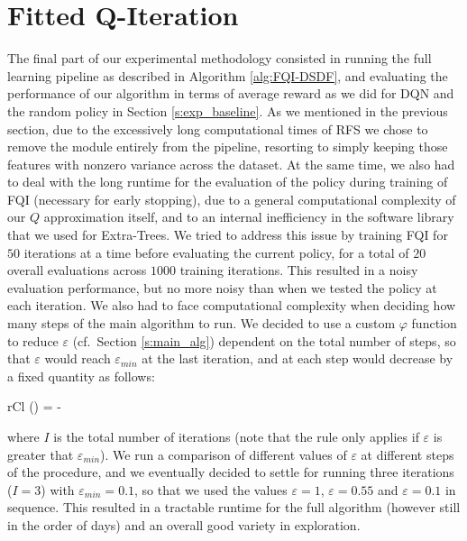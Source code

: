 \section{Fitted Q-Iteration} \label{s:exp_fqi}
The final part of our experimental methodology consisted in running the full
learning pipeline as described in Algorithm \ref{alg:FQI-DSDF}, and evaluating
the performance of our algorithm in terms of average reward as we did for DQN
and the random policy in Section \ref{s:exp_baseline}. 
As we mentioned in the previous section, due to the excessively long 
computational times of RFS we chose to remove the module entirely from the 
pipeline, resorting to simply keeping those features with nonzero variance 
across the dataset. 
At the same time, we also had to deal with the long runtime for the evaluation 
of the policy during training of FQI (necessary for early stopping), due to a 
general computational complexity of our $Q$ approximation itself, and to an 
internal inefficiency in the software library that we used for Extra-Trees.
We tried to address this issue by training FQI for $50$ iterations at a time
before evaluating the current policy, for a total of $20$ overall evaluations
across $1000$ training iterations. 
This resulted in a noisy evaluation performance, but no more noisy than when we
tested the policy at each iteration. 
We also had to face computational complexity when deciding how many steps
of the main algorithm to run. 
We decided to use a custom $\varphi$ function to reduce $\varepsilon$ (cf.\ 
Section \ref{s:main_alg}) dependent on the total number of steps, so that 
$\varepsilon$ would reach $\varepsilon_{min}$ at the last iteration, and 
at each step would decrease by a fixed quantity as follows:
%
\begin{IEEEeqnarray}{rCl}
    \varphi(\varepsilon) = \varepsilon - 
\end{IEEEeqnarray}
%
where $I$ is the total number of iterations (note that the rule only 
applies if $\varepsilon$ is greater that $\varepsilon_{min}$). 
We run a comparison of different values of $\varepsilon$ at 
different steps of the procedure, and we eventually decided to settle for 
running three iterations ($I = 3$) with $\varepsilon_{min} = 0.1$, so that we 
used the values $\varepsilon = 1$, $\varepsilon = 0.55$ and 
$\varepsilon = 0.1$ in sequence. 
This resulted in a tractable runtime for the full algorithm (however 
still in the order of days) and an overall good variety in exploration. 

